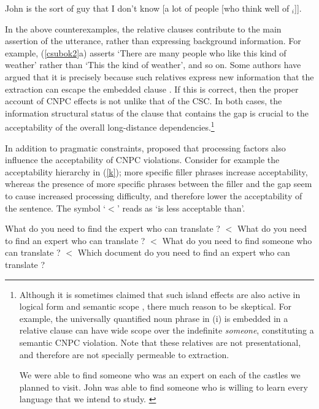 \documentclass[output=paper
	        ,collection
	        ,collectionchapter
 	        ,biblatex
                ,babelshorthands
                ,newtxmath
                ,draftmode
                ,colorlinks, citecolor=brown
]{langscibook}
\begin{document}
\ex John is the sort of guy that I don't know [a lot of people [who think well of
\spc$_i$]].\\
\citep[230]{culicover99}
\zl

In the above counterexamples, the relative clauses contribute to the main assertion of the utterance, rather than expressing background information. For example, (\ref{csubok2}a) asserts `There are many people who like this kind of weather' rather than `This the kind of weather', and so on.
Some authors have argued that it is precisely because such relatives
express new information that the extraction can escape the embedded clause
  \citep{shirlappin,kuno87,Dean,goldberg13}.  If this is correct, then the proper 
  account of CNPC effects is not unlike that of the CSC. In both cases, 
  the information structural status of the clause that contains the gap is crucial
  to the acceptability of the overall long-distance dependencies.\footnote{Although it is sometimes claimed
   that
such  island effects are also active in logical form and semantic scope \citep{may85,ruys,fox,sab,katzira}, 
  there much reason to be skeptical.  For example, the universally quantified noun phrase  in (i)  is embedded in a relative clause can have wide scope over the indefinite \emph{someone}, constituting a semantic CNPC violation. Note that these relatives are not presentational, and therefore are not specially permeable to extraction.

\eal
\ex  We were able to find someone who was an expert on each of the
     castles we planned to visit.  \citep[304]{MRS}
\ex John was able to find someone  who is willing to learn every  language
    that we intend to study. \citep{chavesrnr}
\zllast}

 
 
  
In addition to pragmatic constraints,  \citet{kluender92,kluender}  proposed that 
processing factors also  influence the acceptability of    CNPC violations.
Consider for example the acceptability hierarchy in  (\ref{k});  more specific filler phrases increase acceptability, whereas    the presence of more specific phrases between the filler and the gap seem  to cause increased processing difficulty, and therefore   lower the acceptability of the sentence.  The symbol `$<$' reads as `is less acceptable than'.

\eal \label{k}
\ex What do you need to find the expert who can translate \spc?  $<$
\ex What do you need to find an expert who can translate \spc?   $<$
\ex What do you need to find someone who can translate \spc? $<$
\ex Which document do you need to find an expert who can translate \spc?
\zl
\end{document}
